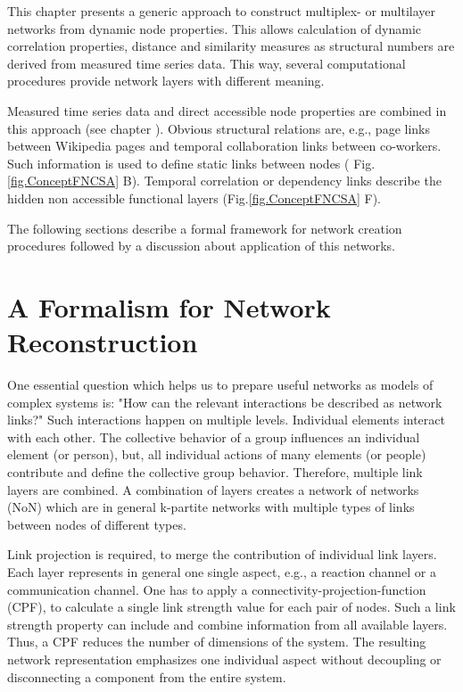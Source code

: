 \documentclass[a4paper,10pt]{scrbook}
\begin{document}
This chapter presents a generic approach to construct multiplex- or multilayer networks from dynamic node properties. This allows calculation of dynamic correlation properties, distance and similarity measures as structural numbers are derived from measured time series data. This way, several computational procedures provide network layers with different meaning.

Measured time series data and direct accessible node properties are combined in this approach (see chapter \label{chap.ContextsensitiveRelevance}). Obvious structural relations are, e.g., page links between Wikipedia pages and temporal collaboration links between co-workers. Such information is used to define static links between nodes ( Fig.\ref{fig.ConceptFNCSA} B). Temporal correlation or dependency links describe the hidden non accessible functional layers (Fig.\ref{fig.ConceptFNCSA} F). 

The following sections describe a formal framework for network creation procedures followed by a discussion about application of this networks. 
   
\section{A Formalism for Network Reconstruction}
\label{NetReconstructionFramework}

One essential question which helps us to prepare useful networks as models of complex systems is: "How can the relevant interactions be described as network links?" Such interactions happen on multiple levels. Individual elements interact with each other. The collective behavior of a group influences an individual element (or person), but, all individual actions of many elements (or people) contribute and define the collective group behavior. Therefore, multiple link layers are combined. A combination of layers creates a network of networks (NoN) which are in general k-partite networks with multiple types of links between nodes of different types.

Link projection is required, to merge the contribution of individual link layers. Each layer represents in general one single aspect, e.g., a reaction channel or a communication channel. One has to apply a connectivity-projection-function (CPF), to calculate a single link strength value for each pair of nodes.  Such a link strength property can include and combine information from all available layers. Thus, a CPF reduces the number of dimensions of the system. The resulting network representation emphasizes one individual aspect without decoupling or disconnecting a component from the entire system.\\
\end{document}

